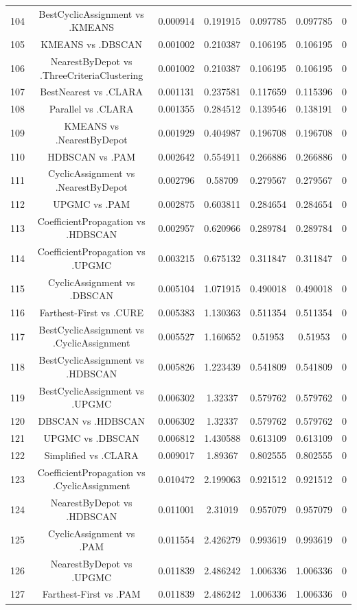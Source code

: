 \documentclass[a4paper,10pt]{article}
\begin{document}
\begin{landscape}
\begin{table}[!htp]
\begin{tabular}{ccccccc}
104&BestCyclicAssignment vs .KMEANS&0.000914&0.191915&0.097785&0.097785&0\\
105&KMEANS vs .DBSCAN&0.001002&0.210387&0.106195&0.106195&0\\
106&NearestByDepot vs .ThreeCriteriaClustering&0.001002&0.210387&0.106195&0.106195&0\\
107&BestNearest vs .CLARA&0.001131&0.237581&0.117659&0.115396&0\\
108&Parallel vs .CLARA&0.001355&0.284512&0.139546&0.138191&0\\
109&KMEANS vs .NearestByDepot&0.001929&0.404987&0.196708&0.196708&0\\
110&HDBSCAN vs .PAM&0.002642&0.554911&0.266886&0.266886&0\\
111&CyclicAssignment vs .NearestByDepot&0.002796&0.58709&0.279567&0.279567&0\\
112&UPGMC vs .PAM&0.002875&0.603811&0.284654&0.284654&0\\
113&CoefficientPropagation vs .HDBSCAN&0.002957&0.620966&0.289784&0.289784&0\\
114&CoefficientPropagation vs .UPGMC&0.003215&0.675132&0.311847&0.311847&0\\
115&CyclicAssignment vs .DBSCAN&0.005104&1.071915&0.490018&0.490018&0\\
116&Farthest-First vs .CURE&0.005383&1.130363&0.511354&0.511354&0\\
117&BestCyclicAssignment vs .CyclicAssignment&0.005527&1.160652&0.51953&0.51953&0\\
118&BestCyclicAssignment vs .HDBSCAN&0.005826&1.223439&0.541809&0.541809&0\\
119&BestCyclicAssignment vs .UPGMC&0.006302&1.32337&0.579762&0.579762&0\\
120&DBSCAN vs .HDBSCAN&0.006302&1.32337&0.579762&0.579762&0\\
121&UPGMC vs .DBSCAN&0.006812&1.430588&0.613109&0.613109&0\\
122&Simplified vs .CLARA&0.009017&1.89367&0.802555&0.802555&0\\
123&CoefficientPropagation vs .CyclicAssignment&0.010472&2.199063&0.921512&0.921512&0\\
124&NearestByDepot vs .HDBSCAN&0.011001&2.31019&0.957079&0.957079&0\\
125&CyclicAssignment vs .PAM&0.011554&2.426279&0.993619&0.993619&0\\
126&NearestByDepot vs .UPGMC&0.011839&2.486242&1.006336&1.006336&0\\
127&Farthest-First vs .PAM&0.011839&2.486242&1.006336&1.006336&0\\

\end{tabular}
\end{table}
\end{landscape}
\end{document}
